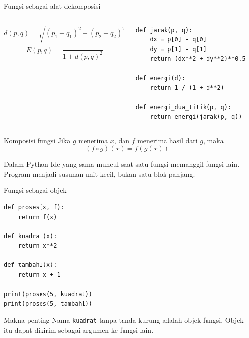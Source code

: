 \documentclass[aspectratio=169,11pt]{beamer}
\begin{document}
\begin{frame}[fragile]{Fungsi sebagai alat dekomposisi}
\begin{columns}[T]
\[
d(p,q)=\sqrt{(p_1-q_1)^2+(p_2-q_2)^2}
\]
\[
E(p,q)=\frac{1}{1+d(p,q)^2}
\]
\begin{lstlisting}
def jarak(p, q):
    dx = p[0] - q[0]
    dy = p[1] - q[1]
    return (dx**2 + dy**2)**0.5

def energi(d):
    return 1 / (1 + d**2)

def energi_dua_titik(p, q):
    return energi(jarak(p, q))
\end{lstlisting}
\end{columns}
\end{frame}

\begin{frame}{Komposisi fungsi}
\vspace{1mm}
Jika $g$ menerima $x$, dan $f$ menerima hasil dari $g$, maka
\[
(f\circ g)(x)=f(g(x)).
\]
\vspace{2mm}
\begin{center}
\end{center}
\vspace{2mm}
\begin{block}{Dalam Python}
Ide yang sama muncul saat satu fungsi memanggil fungsi lain. Program menjadi susunan unit kecil, bukan satu blok panjang.
\end{block}
\end{frame}

\begin{frame}[fragile]{Fungsi sebagai objek}
\begin{lstlisting}
def proses(x, f):
    return f(x)

def kuadrat(x):
    return x**2

def tambah1(x):
    return x + 1

print(proses(5, kuadrat))
print(proses(5, tambah1))
\end{lstlisting}
\begin{block}{Makna penting}
Nama \texttt{kuadrat} tanpa tanda kurung adalah objek fungsi. Objek itu dapat dikirim sebagai argumen ke fungsi lain.
\end{block}
\end{frame}
\end{document}
